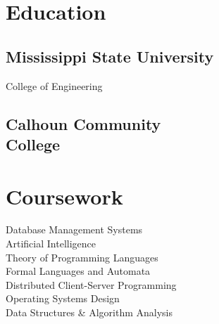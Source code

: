 \documentclass[]{resume}
\begin{document}
\begin{minipage}[t]{0.33\textwidth}

\section{Education}

\subsection{Mississippi State University}
College of Engineering \\

\sectionsep

\subsection[Calhoun Community College]{\texorpdfstring{Calhoun Community\\ College}{Calhoun Community College}}

\sectionsep

\section{Coursework}
Database Management Systems \\
Artificial Intelligence \\
Theory of Programming Languages \\
Formal Languages and Automata \\
Distributed Client-Server Programming \\
Operating Systems Design \\
Data Structures \& Algorithm Analysis \\


\end{minipage}
\end{document}
